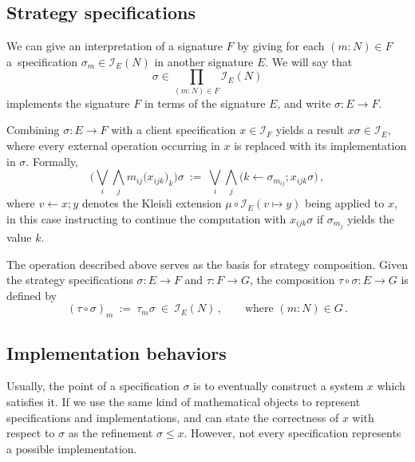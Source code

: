 \documentclass[11pt]{article}
\begin{document}

\subsection{Strategy specifications} %

We can give an interpretation of a signature $F$
by giving for each $(m \mathbin: N) \in F$
a~specification $\sigma_m \in \mathcal{I}_E(N)$
in another signature $E$.
We will say that
\[
  \sigma \in \prod_{(m \mathbin: N) \in F} \mathcal{I}_{E}(N)
\]
implements the signature $F$ in terms of the signature $E$,
and write $\sigma : E \rightarrow F$.

Combining $\sigma : E \rightarrow F$ with
a client specification $x \in \mathcal{I}_F$
yields a result $x\sigma \in \mathcal{I}_E$,
where every external operation occurring in $x$
is replaced with its implementation in $\sigma$.
Formally,
\[
  \Big( \bigvee_i \bigwedge_j m_{ij}\big(x_{ijk}\big)_k \Big) \sigma
  \::=\:
  \bigvee_i \bigwedge_j
    \big(k \mathbin\leftarrow \sigma_{m_{ij}} \mathbin; x_{ijk} \sigma \big)
  \,,
\]
where $v \mathbin\leftarrow x \mathbin; y$
denotes the Kleisli extension
$\mu \circ \mathcal{I}_E(v \mapsto y)$
being applied to $x$,
in this case instructing to continue the computation with $x_{ijk} \sigma$
if $\sigma_{m_j}$ yields the value $k$.

The operation described above serves as the basis for strategy composition.
Given the strategy specifications
$\sigma : E \rightarrow F$ and $\tau : F \rightarrow G$,
the composition $\tau \circ \sigma : E \rightarrow G$ is defined by
\[
  (\tau \circ \sigma)_m \: := \: \tau_m \sigma \: \in \: \mathcal{I}_E(N)
  \,,
  \qquad \text{where }
  (m \mathbin: N) \in G
  \,.
\]


\subsection{Implementation behaviors} %

Usually,
the point of a specification $\sigma$ is to
eventually construct a system $x$ which satisfies it.
If we use the same kind of mathematical objects
to represent specifications and implementations,
and can state the correctness of $x$ with respect to $\sigma$
as the refinement $\sigma \le x$.
However,
not every specification represents a possible implementation.
\end{document}
